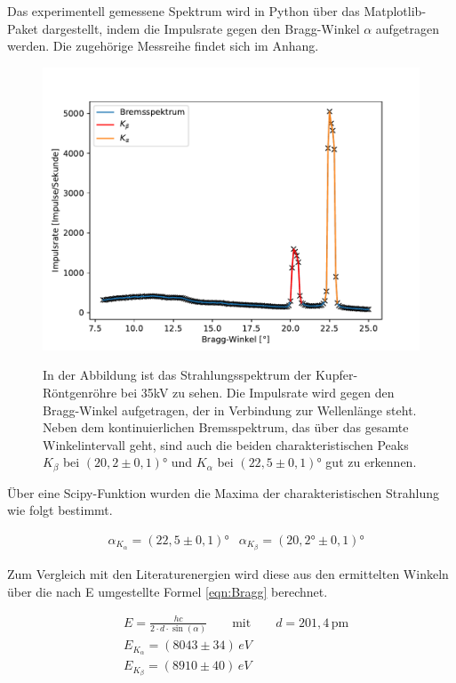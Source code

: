 \documentclass[titlepage = firstcover]{scrartcl}
\begin{document}
        \noindent
        Das experimentell gemessene Spektrum wird in Python über das Matplotlib-Paket dargestellt, indem die Impulsrate gegen den Bragg-Winkel $\alpha$ aufgetragen werden. Die zugehörige 
        Messreihe findet sich im Anhang.
        
        \FloatBarrier
        \begin{figure}[h]
            \centering
            \caption{In der Abbildung ist das Strahlungsspektrum der Kupfer-Röntgenröhre bei 35kV zu sehen. Die Impulsrate wird gegen den Bragg-Winkel aufgetragen, der in Verbindung zur Wellenlänge steht. Neben dem kontinuierlichen Bremsspektrum, das über das gesamte Winkelintervall geht, sind auch die beiden charakteristischen Peaks $K_{\beta}$ bei $(20,2 \pm 0,1)°$ und $K_{\alpha}$ bei $(22,5 \pm 0,1)°$ gut zu erkennen.}
            \includegraphics[width = 0.9\linewidth]{Spektrum_Cu.pdf}
            \label{fig:Spektrum}
        \end{figure}
        \FloatBarrier
        \noindent
        Über eine Scipy-Funktion wurden die Maxima der charakteristischen Strahlung wie folgt bestimmt.

        \begin{align}
            &\alpha_{K_{\alpha}} = (22,5 \pm 0,1)°
            &\alpha_{K_{\beta}}  = (20,2° \pm 0,1)°
        \end{align}

        \noindent
        Zum Vergleich mit den Literaturenergien wird diese aus den ermittelten Winkeln über die nach E umgestellte Formel \ref{eqn:Bragg} berechnet.

        \begin{align}
            &E = \frac{hc}{2 \cdot d \cdot \sin(\alpha)} \qquad \text{mit} \qquad d=201,4 \, \text{pm} \nonumber\\
            &E_{K_{\alpha}} = (8043 \pm 34) \, eV \\
            &E_{K_{\beta}}  = (8910 \pm 40) \, eV
            \label{eqn:EGraph}
        \end{align}
\end{document}
